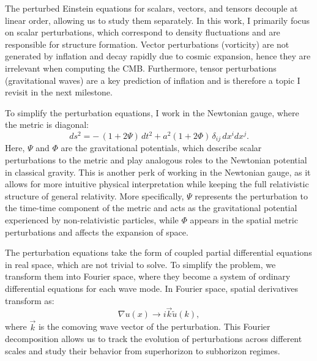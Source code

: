 \documentclass{aa}
\numberwithin{equation}{section}
\numberwithin{table}{section}
\numberwithin{figure}{section}
\begin{document}
The perturbed Einstein equations for scalars, vectors, and tensors decouple at linear order, allowing us to study them separately. In this work, I primarily focus on scalar perturbations, which correspond to density fluctuations and are responsible for structure formation. Vector perturbations (vorticity) are not generated by inflation and decay rapidly due to cosmic expansion, hence they are irrelevant when computing the CMB. Furthermore, tensor perturbations (gravitational waves) are a key prediction of inflation and is therefore a topic I revisit in the next milestone. 

To simplify the perturbation equations, I work in the Newtonian gauge, where the metric is diagonal:
\begin{equation}
ds^2 = - \,(1 + 2\Psi)\,dt^2 + a^2 (1 + 2\Phi)\, \delta_{ij}\, dx^i dx^j.
\end{equation}
Here, $\Psi$ and $\Phi$ are the gravitational potentials, which describe scalar perturbations to the metric and play analogous roles to the Newtonian potential in classical gravity. This is another perk of working in the Newtonian gauge, as it allows for more intuitive physical interpretation while keeping the full relativistic structure of general relativity. More specifically, $\Psi$ represents the perturbation to the time-time component of the metric and acts as the gravitational potential experienced by non-relativistic particles, while $\Phi$ appears in the spatial metric perturbations and affects the expansion of space. 


The perturbation equations take the form of coupled partial differential equations in real space, which are not trivial to solve. To simplify the problem, we transform them into Fourier space, where they become a system of ordinary differential equations for each wave mode. 
In Fourier space, spatial derivatives transform as:  
\begin{equation}
\nabla u(x) \rightarrow i \vec{k} \tilde{u}(k),
\end{equation}
where $\vec{k}$ is the comoving wave vector of the perturbation. This Fourier decomposition allows us to track the evolution of perturbations across different scales and study their behavior from superhorizon to subhorizon regimes. 
\end{document}
